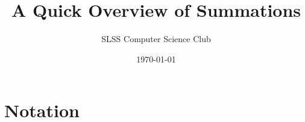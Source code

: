 \documentclass[prereq]{cslesson}
\title{A Quick Overview of Summations}
\author{SLSS Computer Science Club}
\date{\today}
\begin{document}
    
\maketitle
    
\section{Notation}
\end{document}
